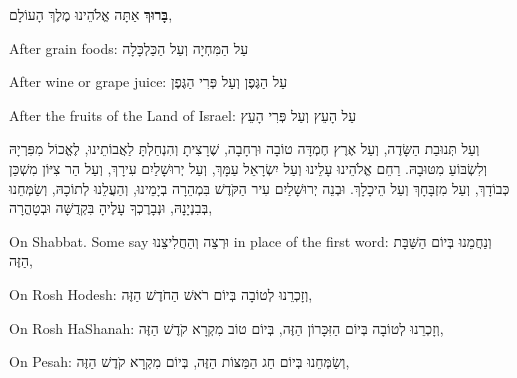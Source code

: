 

\textbf{בָּרוּךְ} אַתָּה \Shem{} אֱלֹהֵינוּ מֶלֶךְ הָעוֹלָם,

\begin{seasonal}{After grain foods:}
עַל הַמִּחְיָה וְעַל הַכַּלְכָּלָה
\end{seasonal}

\begin{seasonal}{After wine or grape juice:}
עַל הַגֶּפֶן וְעַל פְּרִי הַגֶּפֶן
\end{seasonal}

\begin{seasonal}{After the fruits of the Land of Israel:}
עַל הָעֵץ וְעַל פְּרִי הָעֵץ
\end{seasonal}

וְעַל תְּנוּבַת הַשָּׂדֶה, וְעַל אֶרֶץ חֶמְדָּה טוֹבָה וּרְחָבָה, שֶׁרָצִיתָ וְהִנְחַלְתָּ
לַאֲבוֹתֵינוּ, לֶאֱכוֹל מִפִּרְיָהּ וְלִשְׂבּוֹעַ מִטּוּבָהּ. רַחֵם \Shem{} אֱלֹהֵינוּ עָלֵינוּ
וְעַל יִשְׂרָאֵל עַמָּךְ, וְעַל יְרוּשָׁלַיִם עִירָךְ, וְעַל הַר צִיּוֹן מִשְׁכַּן כְּבוֹדָךְ, וְעַל
מִזְבָּחָךְ וְעַל הֵיכָלָךְ. וּבְנֵה יְרוּשָׁלַיִם עִיר הַקֹּדֶשׁ בִּמְהֵרָה בְיָמֵינוּ, וְהַעֲלֵנוּ
לְתוֹכָהּ, וְשַׂמְּחֵנוּ בְּבִנְיָנָהּ, וּנְבָרֶכְךָ עָלֶיהָ בִּקְדֻשָּׁה וּבְטָהֳרָה,

\begin{seasonal}{On Shabbat. Some say \foreignlanguage{hebrew}{וּרְצֵה וְהַחֲלִיצֵנוּ} in place of the first word:}
וְנַחֲמֵנוּ בְּיוֹם הַשַּׁבָּת הַזֶּה,
\end{seasonal}

\begin{seasonal}{On Rosh Hodesh:}
וְזָכְרֵנוּ לְטוֹבָה בְּיוֹם רֹאשׁ הַחֹדֶשׁ הַזֶּה,
\end{seasonal}

\begin{seasonal}{On Rosh HaShanah:}
וְזָכְרֵנוּ לְטוֹבָה בְּיוֹם הַזִּכָּרוֹן הַזֶּה, בְּיוֹם טוֹב מִקְרָא קֹדֶשׁ הַזֶּה,
\end{seasonal}

\begin{seasonal}{On Pesah:}
וְשַׂמְּחֵנוּ בְּיוֹם חַג הַמַּצּוֹת הַזֶּה, בְּיוֹם מִקְרָא קֹדֶשׁ הַזֶּה,
\end{seasonal}

